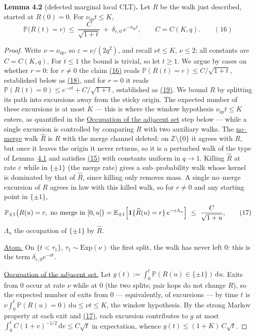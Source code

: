 \documentclass[11pt]{article}
\theoremstyle{plain}
\theoremstyle{definition}
\theoremstyle{remark}
\newcommand{\Z}{\mathbb{Z}}\newcommand{\R}{\mathbb{R}}\newcommand{\N}{\mathbb{N}}
\newcommand{\E}{\mathbb{E}}\newcommand{\PP}{\mathbb{P}}\newcommand{\dd}{\,\mathrm{d}}
\newcommand{\eps}{\varepsilon}\newcommand{\Exp}{\mathrm{Exp}}
\begin{document}
\label{lem_Rlclt}\noindent\textbf{Lemma 4.2} (defected marginal local CLT)\textbf{.} 
Let $R$ be the walk just described, started at $R(0)=0$. For $\nu_{\mathrm{sp}}t\le K$,
\label{eq_Rbound}
\begin{equation}
  \PP\big(R(t)=r\big)\ \le\ \frac{C}{\sqrt{1+t}}\ +\ \delta_{r,0}\,e^{-\nu_{\mathrm{sp}}t},
  \qquad C=C(K,q).\qquad(16)
\end{equation}
\par
\begin{proof}
Write $\nu=\nu_{\mathrm{sp}}$, so $\eps=\nu/(2q^2)$, and recall $\nu t\le K$,
$\nu\le2$; all constants are $C=C(K,q)$. For $t\le1$ the bound is trivial, so let
$t\ge1$. We argue by cases on whether $r=0$: for $r\ne0$ the claim \hyperref[eq_Rbound]{(16)}
reads $\PP(R(t)=r)\le C/\sqrt{1+t}$, established below as \hyperref[eq_Roff]{(18)}, and for
$r=0$ it reads $\PP(R(t)=0)\le e^{-\nu t}+C/\sqrt{1+t}$, established as
\hyperref[eq_Rzero]{(19)}. We bound $R$ by splitting its path into excursions away from the sticky origin. The
expected number of these excursions is at most $K$ --- this is where the window
hypothesis $\nu_{\mathrm{sp}}t\le K$ enters, as quantified in the \underline{Occupation
of the adjacent set} step below --- while a single excursion is controlled by comparing
$R$ with two auxiliary walks. The \underline{no--merge}
walk $\widehat R$ is $R$ with the merge channel deleted: on $\Z\setminus\{0\}$ it agrees
with $R$, but once it leaves the origin it never returns, so it is a perturbed walk of
the type of Lemma~\hyperref[lem_free]{4.1} and satisfies \hyperref[eq_tildeR]{(15)} with constants uniform
in $q\to1$. Killing $\widehat R$ at rate $\eps$ while in $\{\pm1\}$ (the merge rate)
gives a sub--probability walk whose kernel is dominated by that of $\widehat R$, since
killing only removes mass. A single no--merge excursion of $R$ agrees in law with this
killed walk, so for $r\ne0$ and any starting point in $\{\pm1\}$,
\label{eq_killdom}
\begin{equation}
  \PP_{\pm1}\big(R(u)=r,\ \text{no merge in }[0,u]\big)
  =\E_{\pm1}\Big[\bone\{\widehat R(u)=r\}\,e^{-\eps\Lambda_u}\Big]
  \ \le\ \frac{C}{\sqrt{1+u}},\qquad(17)
\end{equation}
$\Lambda_u$ the occupation of $\{\pm1\}$ by $\widehat R$.

\underline{Atom.} On $\{t<\tau_1\}$, $\tau_1\sim\Exp(\nu)$ the first split, the walk has
never left $0$: this is the term $\delta_{r,0}e^{-\nu t}$.

\underline{Occupation of the adjacent set.} Let
$g(t):=\int_0^t\PP(R(u)\in\{\pm1\})\dd u$. Exits from $0$ occur at rate $\nu$ while at
$0$ (the two splits; pair hops do not change $R$), so the expected number of exits from
$0$ --- equivalently, of excursions --- by time $t$ is
$\nu\int_0^t\PP(R(u)=0)\dd u\le\nu t\le K$, the window hypothesis. By the strong Markov property
at each exit and \hyperref[eq_killdom]{(17)}, each excursion contributes to $g$ at most
$\int_0^tC(1+v)^{-1/2}\dd v\le C\sqrt t$ in expectation, whence
$g(t)\le(1+K)\,C\sqrt t$.


\end{proof}
\end{document}
